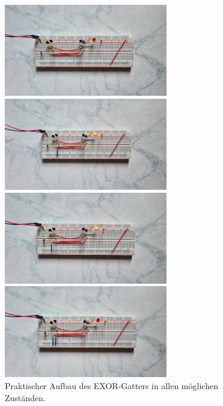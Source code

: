 \begin{figure}[h!]
	\begin{minipage}{.5\textwidth}
		\centering
		\includegraphics[height=4cm, keepaspectratio]{./Fotos/EXOR-00.jpg}
		\vspace{1cm}
	\end{minipage}%
	\begin{minipage}{.5\textwidth}
		\centering
		\includegraphics[height=4cm, keepaspectratio]{./Fotos/EXOR-01.jpg}
		\vspace{1cm}
	\end{minipage}
	\begin{minipage}{.5\textwidth}
		\centering
		\includegraphics[height=4cm, keepaspectratio]{./Fotos/EXOR-10.jpg}
	\end{minipage}%
	\begin{minipage}{.5\textwidth}
		\centering
		\includegraphics[height=4cm, keepaspectratio]{./Fotos/EXOR-11.jpg}
	\end{minipage}
	\caption{Praktischer Aufbau des EXOR-Gatters in allen möglichen Zuständen.}
\end{figure}\\
\newpage

